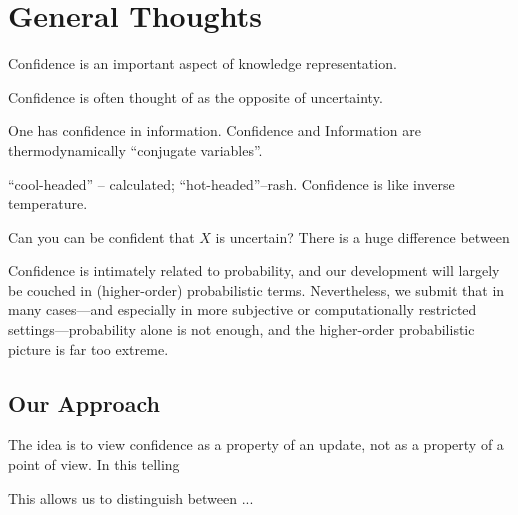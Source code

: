 \documentclass{article}
\begin{document}
\section{General Thoughts}
Confidence is an important aspect of knowledge representation.

Confidence is often thought of as the opposite of uncertainty.


One has confidence in information. 
Confidence and Information are thermodynamically ``conjugate variables''. 


``cool-headed'' -- calculated; ``hot-headed''--rash. Confidence is like inverse temperature.

Can you can be confident that $X$ is uncertain?
There is a huge difference between



Confidence is intimately related to probability, and our development will largely be couched in (higher-order) probabilistic terms.
Nevertheless, we submit that in many cases---and especially in more subjective or computationally restricted settings---probability alone is not enough, and the higher-order probabilistic picture is far too extreme.



\subsection*{Our Approach}
The idea is to view confidence as a property of an update, not as a property of a point of view.
In this telling

This allows us to distinguish between ...
% 

% 
% 
\end{document}
